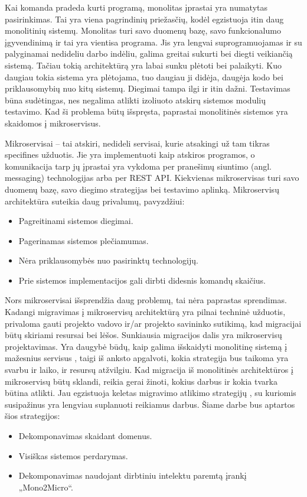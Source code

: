 \documentclass[fleqn]{VUMIFPSkursinis}
\begin{document}
Kai komanda pradeda kurti programą, monolitas įprastai yra numatytas pasirinkimas. Tai yra viena pagrindinių priežasčių, kodėl egzistuoja itin daug monolitinių sistemų. Monolitas turi savo duomenų bazę, savo funkcionalumo įgyvendinimą ir tai yra vientisa programa. Jis yra lengvai suprogramuojamas ir su palyginamai nedideliu darbo indėliu, galima greitai sukurti bei diegti veikiančią sistemą. Tačiau tokią architektūrą yra labai sunku plėtoti bei palaikyti. Kuo daugiau  tokia sistema yra plėtojama, tuo daugiau ji didėja, daugėja kodo bei priklausomybių nuo kitų sistemų. Diegimai tampa ilgi ir itin dažni. Testavimas būna sudėtingas, nes negalima atlikti izoliuoto atskirų sistemos modulių testavimo. Kad ši problema būtų išspręsta, paprastai monolitinės sistemos yra skaidomos į mikroservisus.

Mikroservisai – tai atskiri, nedideli servisai, kurie atsakingi už tam tikras specifines užduotis. Jie yra implementuoti kaip atskiros programos, o komunikacija tarp jų įprastai yra vykdoma per pranešimų siuntimo (angl. messaging) technologijas arba per REST API. Kiekvienas mikroservisas turi savo duomenų bazę, savo diegimo strategijas bei testavimo aplinką. Mikroservisų architektūra suteikia daug privalumų, pavyzdžiui:
\begin{itemize}
    \item Pagreitinami sistemos diegimai.
    \item Pagerinamas sistemos plečiamumas.
    \item Nėra priklausomybės nuo pasirinktų technologijų.
    \item Prie sistemos implementacijos gali dirbti didesnis komandų skaičius.
\end{itemize}

Nors mikroservisai išsprendžia daug problemų, tai nėra paprastas sprendimas. Kadangi migravimas į mikroservisų architektūrą yra pilnai techninė užduotis, privaloma gauti projekto vadovo ir/ar projekto savininko sutikimą, kad migracijai būtų skiriami resursai bei lėšos. Sunkiausia migracijos dalis yra mikroservisų projektavimas. Yra daugybė būdų, kaip galima išskaidyti monolitinę sistemą į mažesnius servisus \cite{FBZ+19}, taigi iš anksto apgalvoti, kokia strategija bus taikoma yra svarbu ir laiko, ir resursų atžvilgiu. Kad migracija iš monolitinės architektūros į mikroservisų būtų sklandi, reikia gerai žinoti, kokius darbus ir kokia tvarka būtina atlikti. Jau egzistuoja keletas migravimo atlikimo strategijų \cite{Wal22,MQO18,KXL+20}, su kuriomis susipažinus yra lengviau suplanuoti reikiamus darbus. Šiame darbe bus aptartos šios strategijos:
\begin{itemize}
    \item Dekomponavimas skaidant domenus.
    \item Visiškas sistemos perdarymas.
    \item Dekomponavimas naudojant dirbtiniu intelektu paremtą įrankį „Mono2Micro“.\\\\
\end{itemize}
\end{document}
